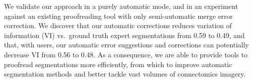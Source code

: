 We validate our approach in a purely automatic mode, and in an experiment against an existing proofreading tool with only semi-automatic merge error correction\cite{haehn_dojo_2014}. We discover that our automatic corrections reduces variation of information (VI) vs.~ground truth expert segmentations from 0.59 to 0.49, and that, with users, our automatic error suggestions and corrections can potentially decrease VI from 0.56 to 0.48. As a consequence, we are able to provide tools to proofread segmentations more efficiently, from which to improve automatic segmentation methods and better tackle vast volumes of connectomics imagery.

%
%
